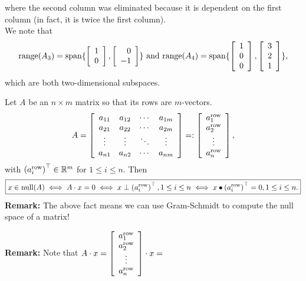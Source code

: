 where the second column was eliminated because it is dependent on the first column (in fact, it is twice the first column).\\

We note that 
$$ \mathrm{range}(A_3) = \mathrm{span} \{ \left[\begin{array}{r}  1 \\ 0 \end{array} \right], \left[\begin{array}{r}  0 \\ -1 \end{array} \right] \} \text{ and } \mathrm{range}(A_4) = \mathrm{span} \{  \left[\begin{array}{r}  1 \\ 0 \\ 0\end{array} \right] ,\left[\begin{array}{c}  3 \\ 2 \\ 1 \end{array} \right]  \},$$
which are both two-dimensional subspaces.  \Qed

\vspace*{.2cm}
\begin{tcolorbox}[title=\textbf{Null Space of $A$ Consists of Vectors Orthogonal to the Rows of $A$}]

Let $A$ be an $n \times m$ matrix so that its rows are $m$-vectors.
$$A=\left[\begin{array}{cccc} a_{11}& a_{12}& \cdots & a_{1m} \\
 a_{21}& a_{22}& \cdots & a_{2m}  \\
 \vdots & \vdots&  \ddots & \vdots \\
 a_{n1}& a_{n2}& \cdots & a_{nm} 
 \end{array}\right] =: \left[\begin{array}{c} a^{\rm row}_1 \\ a^{\rm row}_2 \\ \vdots \\ a^{\rm row}_n\end{array}\right],$$
 with $ \left(a^{\rm row}_i \right)^\top \in \mathbb R^m$ for $1 \le i \le n$. 
 Then
 $$\boxed{ x \in \mathrm{null}(A) \iff A \cdot x = 0 \iff x \perp \left(a^{\rm row}_i \right)^\top, 1 \le i \le n \iff x \bullet \left(a^{\rm row}_i \right)^\top = 0, 1 \le i \le n. } $$
 \vspace*{.2cm}
 \textbf{Remark:} The above fact means we can use Gram-Schmidt to compute the null space of a matrix! 
 
  \vspace*{.2cm}
  
 \textbf{Remark:} Note that $A \cdot x = \left[\begin{array}{c} a^{\rm row}_1 \\ a^{\rm row}_2 \\ \vdots \\ a^{\rm row}_n\end{array}\right] \cdot x = $
  
\end{tcolorbox}

